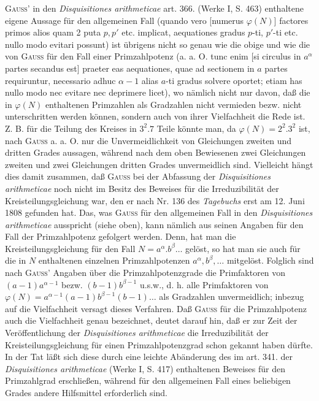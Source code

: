 \par\noindent\hspace*{\parindent}\textsc{Gauss}' in den \textit{Disquisitiones arithmeticae} art. 366. (Werke I, S. 463) enthaltene eigene Aussage für den allgemeinen Fall (quando vero [numerus \(\varphi(N)\)] factores primos alios quam 2 puta \(p,p'\) etc. implicat, aequationes gradus \(p\)-ti, \(p'\)-ti etc. nullo modo evitari possunt) ist übrigens nicht so genau wie die obige und wie die von \textsc{Gauss} für den Fall einer Primzahlpotenz (a. a. O. tunc enim [si circulus in \(a^\alpha\) partes secandus est] praeter eas aequationes, quae ad sectionem in \(a\) partes requiruntur, necessario adhuc \(\alpha-1\) alias \(a\)-ti gradus solvere oportet; etiam has nullo modo nec evitare nec deprimere licet), wo nämlich nicht nur davon, daß die in \(\varphi(N)\) enthaltenen Primzahlen als Gradzahlen nicht vermieden bezw. nicht unterschritten werden können, sondern auch von ihrer Vielfachheit die Rede ist. Z. B. für die Teilung des Kreises in \(3^2\mathord{.}7\) Teile könnte man, da \(\varphi(N)=2^2\mathord{.}3^2\) ist, nach \textsc{Gauss} a. a. O. nur die Unvermeidlichkeit von Gleichungen zweiten und dritten Grades aussagen, während nach dem oben Bewiesenen zwei Gleichungen zweiten und zwei Gleichungen dritten Grades unvermeidlich sind. Vielleicht hängt dies damit zusammen, daß \textsc{Gauss} bei der Abfassung der \textit{Disquisitiones arithmeticae} noch nicht im Besitz des Beweises für die Irreduzibilität der  Kreisteilungsgleichung war, den er nach Nr. 136 des \textit{Tagebuchs} erst am 12. Juni 1808 gefunden hat. Das, was \textsc{Gauss} für den allgemeinen Fall in den \textit{Disquisitiones arithmeticae} ausspricht (siehe oben), kann nämlich aus seinen Angaben für den Fall der Primzahlpotenz  gefolgert werden. Denn, hat man die Kreisteilungsgleichung für den Fall \(N=a^\alpha\mathord{.}b^\beta\ldots\) gelöst, so hat man sie auch für die in \(N\) enthaltenen einzelnen Primzahlpotenzen \(a^\alpha,b^\beta,\ldots\) mitgelöst. Folglich sind nach \textsc{Gauss}' Angaben über die Primzahlpotenzgrade die Primfaktoren von \((a-1)a^{\alpha-1}\) bezw. \((b-1)b^{\beta-1}\) u.s.w., d. h. alle Primfaktoren von \(\varphi(N)=a^{\alpha-1}(a-1)b^{\beta-1}(b-1)\ldots\) als Gradzahlen unvermeidlich; inbezug auf die Vielfachheit versagt dieses Verfahren. Daß \textsc{Gauss} für die Primzahlpotenz auch die Vielfachheit genau bezeichnet, deutet darauf hin, daß er zur Zeit der Veröffentlichung der \textit{Disquisitiones arithmeticae} die Irreduzibilität der Kreisteilungsgleichung für einen Primzahlpotenzgrad schon gekannt haben dürfte. In der Tat läßt sich diese durch eine leichte Abänderung des im art. 341. der \textit{Disquisitiones arithmeticae} (Werke I, S. 417) enthaltenen Beweises für den Primzahlgrad erschließen, während für den allgemeinen Fall eines beliebigen Grades andere Hilfsmittel erforderlich sind.
